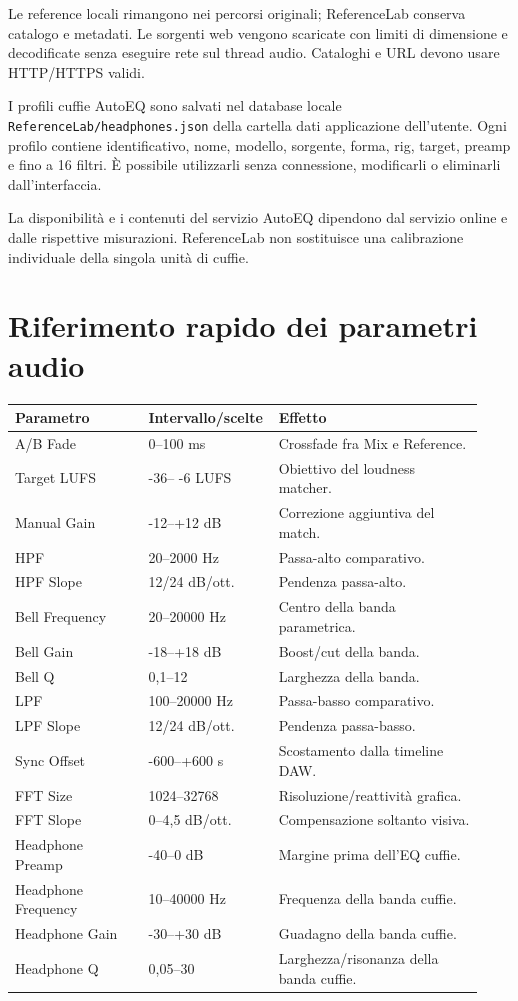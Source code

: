 \documentclass[11pt,a4paper]{article}
\begin{document}
Le reference locali rimangono nei percorsi originali; ReferenceLab conserva
catalogo e metadati. Le sorgenti web vengono scaricate con limiti di dimensione
e decodificate senza eseguire rete sul thread audio. Cataloghi e URL devono
usare HTTP/HTTPS validi.

I profili cuffie AutoEQ sono salvati nel database locale
\texttt{ReferenceLab/headphones.json} della cartella dati applicazione
dell'utente. Ogni profilo contiene identificativo, nome, modello, sorgente,
forma, rig, target, preamp e fino a 16 filtri. È possibile utilizzarli senza
connessione, modificarli o eliminarli dall'interfaccia.

La disponibilità e i contenuti del servizio AutoEQ dipendono dal servizio
online e dalle rispettive misurazioni. ReferenceLab non sostituisce una
calibrazione individuale della singola unità di cuffie.

\section{Riferimento rapido dei parametri audio}

\begin{longtable}{p{0.28\linewidth}p{0.22\linewidth}p{0.43\linewidth}}
\toprule
\textbf{Parametro} & \textbf{Intervallo/scelte} & \textbf{Effetto}\\
\midrule
\endhead
A/B Fade & 0--100 ms & Crossfade fra Mix e Reference.\\
Target LUFS & -36-- -6 LUFS & Obiettivo del loudness matcher.\\
Manual Gain & -12--+12 dB & Correzione aggiuntiva del match.\\
HPF & 20--2000 Hz & Passa-alto comparativo.\\
HPF Slope & 12/24 dB/ott. & Pendenza passa-alto.\\
Bell Frequency & 20--20000 Hz & Centro della banda parametrica.\\
Bell Gain & -18--+18 dB & Boost/cut della banda.\\
Bell Q & 0,1--12 & Larghezza della banda.\\
LPF & 100--20000 Hz & Passa-basso comparativo.\\
LPF Slope & 12/24 dB/ott. & Pendenza passa-basso.\\
Sync Offset & -600--+600 s & Scostamento dalla timeline DAW.\\
FFT Size & 1024--32768 & Risoluzione/reattività grafica.\\
FFT Slope & 0--4,5 dB/ott. & Compensazione soltanto visiva.\\
Headphone Preamp & -40--0 dB & Margine prima dell'EQ cuffie.\\
Headphone Frequency & 10--40000 Hz & Frequenza della banda cuffie.\\
Headphone Gain & -30--+30 dB & Guadagno della banda cuffie.\\
Headphone Q & 0,05--30 & Larghezza/risonanza della banda cuffie.\\
\bottomrule
\end{longtable}
\end{document}
